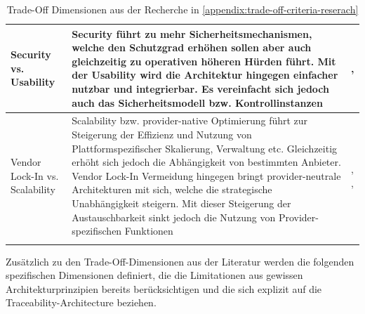 \begin{longtable}{|
  L{3cm}|
  p{\dimexpr\textwidth-6cm-6\arrayrulewidth\relax}|
  L{3cm}|
}
    Security vs. Usability &
    Security führt zu mehr Sicherheitsmechanismen, welche den Schutzgrad erhöhen sollen aber auch gleichzeitig zu operativen höheren Hürden führt. Mit der Usability wird die Architektur hingegen einfacher nutzbar und integrierbar. Es vereinfacht sich jedoch auch das Sicherheitsmodell bzw. Kontrollinstanzen
    &
    \cite{berlato_exploring_2020}, \cite{casola_security-by-design_2018}
    \\
    \hline

    Vendor Lock-In vs. Scalability &
    Scalability bzw. provider-native Optimierung führt zur Steigerung der Effizienz und Nutzung von Plattformspezifischer Skalierung, Verwaltung etc. Gleichzeitig erhöht sich jedoch die Abhängigkeit von bestimmten Anbieter. Vendor Lock-In Vermeidung hingegen bringt provider-neutrale Architekturen mit sich, welche die strategische Unabhängigkeit steigern. Mit dieser Steigerung der Austauschbarkeit sinkt jedoch die Nutzung von Provider-spezifischen Funktionen
    &
    \cite{berlato_exploring_2020}, \cite{quint_towards_2018}, \cite{zhao_supporting_2022}
    \\
    \hline

    \caption{Trade-Off Dimensionen aus der Recherche in \autoref{appendix:trade-off-criteria-reserach}}
    \label{tab:tension-fields-external}
\end{longtable}

Zusätzlich zu den Trade-Off-Dimensionen aus der Literatur werden die folgenden spezifischen Dimensionen definiert, die die Limitationen aus gewissen Architekturprinzipien bereits berücksichtigen und die sich explizit auf die Traceability-Architecture beziehen.

